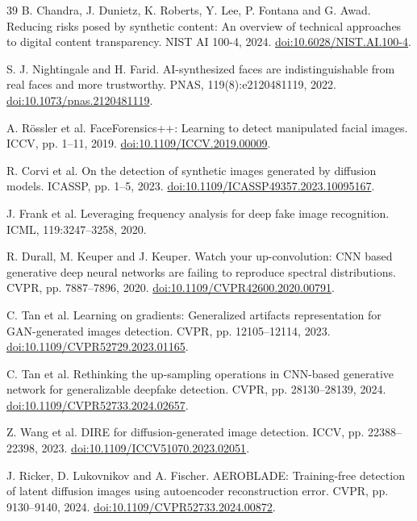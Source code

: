 \documentclass[11pt,a4paper]{article}
\begin{document}
\begin{thebibliography}{39}
 B. Chandra, J. Dunietz, K. Roberts, Y. Lee, P. Fontana and G. Awad. Reducing risks posed by synthetic content: An overview of technical approaches to digital content transparency. NIST AI 100-4, 2024. \href{https://doi.org/10.6028/NIST.AI.100-4}{doi:10.6028/NIST.AI.100-4}.

 S. J. Nightingale and H. Farid. AI-synthesized faces are indistinguishable from real faces and more trustworthy. PNAS, 119(8):e2120481119, 2022. \href{https://doi.org/10.1073/pnas.2120481119}{doi:10.1073/pnas.2120481119}.

 A. Rössler et al. FaceForensics++: Learning to detect manipulated facial images. ICCV, pp. 1--11, 2019. \href{https://doi.org/10.1109/ICCV.2019.00009}{doi:10.1109/ICCV.2019.00009}.

 R. Corvi et al. On the detection of synthetic images generated by diffusion models. ICASSP, pp. 1--5, 2023. \href{https://doi.org/10.1109/ICASSP49357.2023.10095167}{doi:10.1109/ICASSP49357.2023.10095167}.

 J. Frank et al. Leveraging frequency analysis for deep fake image recognition. ICML, 119:3247--3258, 2020.

 R. Durall, M. Keuper and J. Keuper. Watch your up-convolution: CNN based generative deep neural networks are failing to reproduce spectral distributions. CVPR, pp. 7887--7896, 2020. \href{https://doi.org/10.1109/CVPR42600.2020.00791}{doi:10.1109/CVPR42600.2020.00791}.

 C. Tan et al. Learning on gradients: Generalized artifacts representation for GAN-generated images detection. CVPR, pp. 12105--12114, 2023. \href{https://doi.org/10.1109/CVPR52729.2023.01165}{doi:10.1109/CVPR52729.2023.01165}.

 C. Tan et al. Rethinking the up-sampling operations in CNN-based generative network for generalizable deepfake detection. CVPR, pp. 28130--28139, 2024. \href{https://doi.org/10.1109/CVPR52733.2024.02657}{doi:10.1109/CVPR52733.2024.02657}.

 Z. Wang et al. DIRE for diffusion-generated image detection. ICCV, pp. 22388--22398, 2023. \href{https://doi.org/10.1109/ICCV51070.2023.02051}{doi:10.1109/ICCV51070.2023.02051}.

 J. Ricker, D. Lukovnikov and A. Fischer. AEROBLADE: Training-free detection of latent diffusion images using autoencoder reconstruction error. CVPR, pp. 9130--9140, 2024. \href{https://doi.org/10.1109/CVPR52733.2024.00872}{doi:10.1109/CVPR52733.2024.00872}.


\end{thebibliography}
\end{document}
